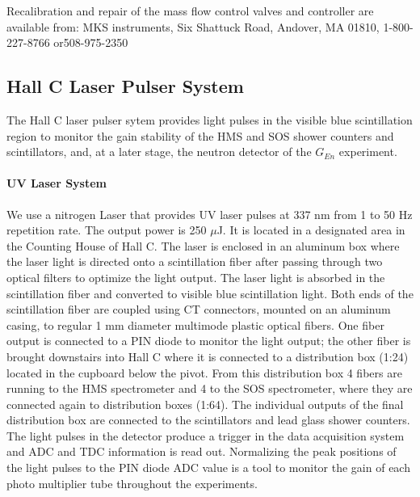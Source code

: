 Recalibration and repair of the mass flow control valves and controller are
available from:  MKS instruments, Six Shattuck Road, Andover, MA 01810,  
1-800-227-8766 or508-975-2350



\subsection{Hall C Laser Pulser System}
The Hall C laser pulser sytem provides light pulses
in the visible  blue scintillation region to monitor
the gain stability of the HMS and SOS shower counters and scintillators,
and, at a later stage, the neutron detector of the $G_{En}$ experiment.

\paragraph{UV Laser System}
We use a nitrogen Laser that provides UV laser pulses at 337 nm
from 1 to 50 Hz repetition rate. The output power is 250 $\mu$J.
It is located in a designated area in the Counting House of Hall C.
The laser is enclosed in an aluminum box where the laser light is directed
onto a scintillation fiber after passing through two optical filters
to optimize the light output. 
The laser light is absorbed in the scintillation fiber
and converted to visible blue scintillation light. Both ends of the
scintillation fiber are coupled using CT connectors, mounted on an
aluminum casing, to regular
1 mm diameter multimode plastic optical fibers. One fiber output is
connected to a PIN diode to monitor the light output; the other
fiber is brought downstairs into Hall C where it is connected to 
a distribution box (1:24) located in the cupboard below the pivot. From
this distribution box 4 fibers are running to the HMS spectrometer and
4 to the SOS spectrometer, where they
are connected again to distribution boxes (1:64). The individual
outputs of the final distribution box are connected to the scintillators
and lead glass shower counters. The light pulses in the detector
produce a trigger in the data acquisition system and ADC and TDC
information is read out. Normalizing the peak positions of the light 
pulses to the PIN diode ADC value is a tool to monitor the gain of
each photo multiplier tube throughout the experiments.

